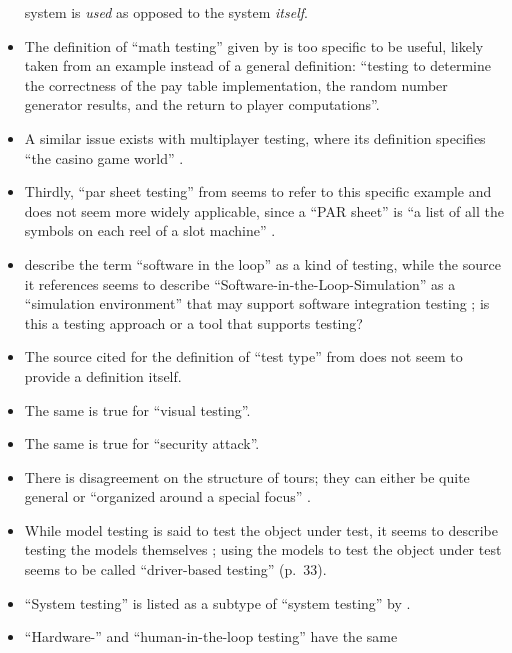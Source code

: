 \begin{itemize}
            system is \emph{used} as opposed to the system \emph{itself}.
      \item The definition of ``math testing'' given by \citetISTQB{} is
            too specific to be useful, likely taken from an example instead of
            a general definition: ``testing to determine the correctness of the
            pay table implementation, the random number generator results, and
            the return to player computations''.
      \item A similar issue exists with multiplayer testing, where its
            definition specifies ``the casino game world'' \citepISTQB{}.
      \item Thirdly, ``par sheet testing'' from \citepISTQB{} seems to
            refer to this specific example and does not seem more widely
            applicable, since a ``PAR sheet'' is ``a list of all the symbols
            on each reel of a slot machine'' \citep{Bluejay2024}.
      \item \citetISTQB{} describe the term ``software in the loop'' as a
            kind of testing, while the source it references seems to describe
            ``Software-in-the-Loop-Simulation'' as a ``simulation environment''
            that may support software integration testing
            \citep[p.~153]{SPICE2022}; is this a testing approach or a tool
            that supports testing?
      \item The source cited for the definition of ``test type'' from
            \citepISTQB{} does not seem to provide a definition itself.
      \item The same is true for ``visual testing''.
      \item The same is true for ``security attack''.
            \fi
      \item There is disagreement on the structure of tours; they can either be
            quite general \citep[p.~34]{IEEE2022} or ``organized around a
            special focus'' \citepISTQB{}.
            \ifnotpaper
      \item While model testing is said to test the object under test,
            it seems to describe testing the models themselves
            \citet[p.~20]{Firesmith2015}; using the models to test the object
            under test seems to be called ``driver-based testing'' (p.~33).
      \item ``System testing'' is listed as a subtype of ``system testing'' by
            \citet[p.~23]{Firesmith2015}.
      \item ``Hardware-'' and ``human-in-the-loop testing'' have the same

\end{itemize}
